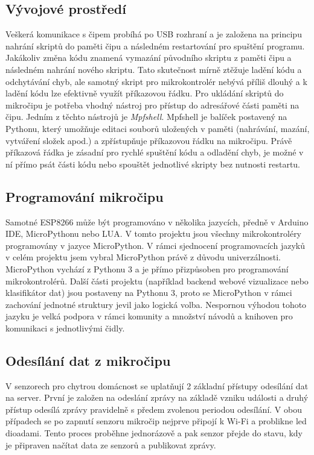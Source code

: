 \subsection*{Vývojové prostředí}
Veškerá komunikace s čipem probíhá po USB rozhraní a je založena na principu nahrání skriptů do paměti čipu a následném restartování pro spuštění programu. Jakákoliv změna kódu znamená vymazání původního skriptu z paměti čipu a následném nahrání nového skriptu. Tato skutečnost mírně ztěžuje ladění kódu a odchytávání chyb, ale samotný skript pro mikrokontrolér nebývá příliš dlouhý a k ladění kódu lze efektivně využít příkazovou řádku. Pro ukládání skriptů do mikročipu je potřeba vhodný nástroj pro přístup do adresářové části paměti na čipu. Jedním z těchto nástrojů je \textit{Mpfshell}. Mpfshell je balíček postavený na Pythonu, který umožňuje editaci souborů uložených v paměti (nahrávání, mazání, vytváření složek apod.) a zpřístupňuje příkazovou řádku na mikročipu. Právě příkazová řádka je zásadní pro rychlé spuštění kódu a odladění chyb, je možné v ní přímo psát části kódu nebo spouštět jednotlivé skripty bez nutnosti restartu.

\subsection*{Programování mikročipu}
Samotné ESP8266 může být programováno v několika jazycích, předně v Arduino IDE, MicroPythonu nebo LUA. V tomto projektu jsou všechny mikrokontroléry programovány v jazyce MicroPython. V rámci sjednocení programovacích jazyků v celém projektu jsem vybral MicroPython právě z důvodu univerzálnosti. MicroPython vychází z Pythonu 3 a je přímo přizpůsoben pro programování mikrokontrolérů. Další části projektu (například backend webové vizualizace nebo klasifikátor dat) jsou postaveny na Pythonu 3, proto se MicroPython v rámci zachování jednotné struktury jevil jako logická volba. Nespornou výhodou tohoto jazyku je velká podpora v rámci komunity a množství návodů a knihoven pro komunikaci s jednotlivými čidly. 

\subsection*{Odesílání dat z mikročipu}
V senzorech pro chytrou domácnost se uplatňují 2 základní přístupy odesílání dat na server. První je založen na odeslání zprávy na základě vzniku události a druhý přístup odesílá zprávy pravidelně s předem zvolenou periodou odesílání. V obou případech se po zapnutí senzoru mikročip nejprve připojí k Wi-Fi a problikne led dioadami. Tento proces proběhne jednorázově a pak senzor přejde do stavu, kdy je připraven načítat data ze senzorů a publikovat zprávy.

